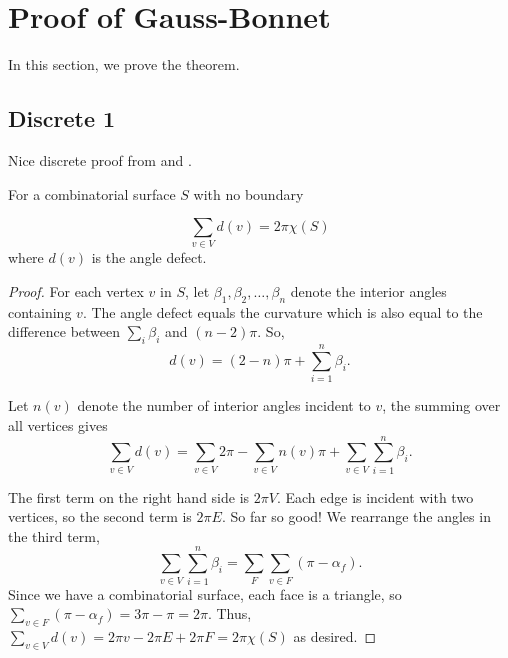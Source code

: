 \section{Proof of Gauss-Bonnet}
\label{sec:proof}


In this section, we prove the theorem.

\subsection{Discrete 1}
Nice discrete proof from \cite{upadhyay2015} and \cite{Crane:2013}.

\begin{theorem}\label{thm:g-b-simple}
For a combinatorial surface $S$ with no boundary

$$\sum_{v\in V} d(v)=2\pi \chi(S)$$
where $d(v)$ is the angle defect.
\end{theorem}

\begin{proof}
For each vertex $v$ in $S$,
let $\beta_1,\beta_2,\ldots,\beta_n$ denote the interior angles
containing $v$.
The angle defect equals the curvature which is also
equal to the difference between $\sum_i \beta_i $ and $(n-2)\pi$. 
So, $$d(v)=(2-n)\pi +\sum_{i=1}^n \beta_i.$$

Let $n(v)$ denote the number of interior angles incident to $v$, the summing over all vertices gives
$$\sum_{v\in V} d(v)=\sum_{v\in V}2\pi - \sum_{v\in V}n(v)\pi+\sum_{v\in V}\sum_{i=1}^n \beta_i.$$

The first term on the right hand side is $2\pi V$. Each edge is incident with two vertices, so the second
term is $2\pi E$. So far so good!
We rearrange the angles in the third term,
$$ \sum_{v\in V}\sum_{i=1}^n \beta_i=\sum_F\sum_{v\in F}(\pi-\alpha_f).$$
Since we have a combinatorial surface, each face is a triangle,
so $\sum_{v\in F}(\pi-\alpha_f)=3\pi-\pi=2\pi.$
Thus, $\sum_{v\in V} d(v)=2\pi v-2\pi E+2\pi F=2\pi \chi(S)$ as desired.
\end{proof}
